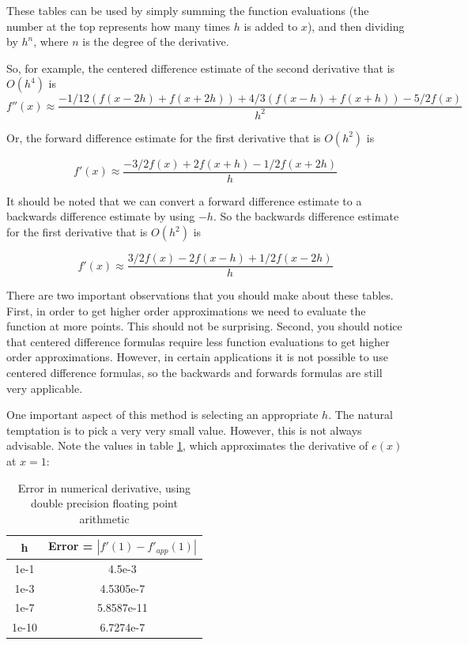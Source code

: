 These tables can be used by simply summing the function evaluations (the number at the top represents how many times $h$ is added to $x$), and then dividing by $h^n$, where $n$ is the degree of the derivative.

So, for example, the centered difference estimate of the second derivative that is $O(h^4)$ is
\begin{equation*}
f''(x) \approx \frac{-1/12(f(x-2h) + f(x+2h)) + 4/3(f(x-h) + f(x+h)) -5/2f(x)}{h^2}
\end{equation*}

Or, the forward difference estimate for the first derivative that is $O(h^2)$ is

\begin{equation*}
f'(x) \approx \frac{-3/2f(x) + 2f(x+h) - 1/2 f(x+2h)}{h}
\end{equation*}

It should be noted that we can convert a forward difference estimate to a backwards difference estimate by using $-h$. So the backwards difference estimate for the first derivative that is $O(h^2)$ is

\begin{equation*}
f'(x) \approx \frac{3/2f(x) - 2f(x-h) + 1/2 f(x-2h)}{h}
\end{equation*}

There are two important observations that you should make about these tables. First, in order to get higher order approximations we need to evaluate the function at more points. This should not be surprising. Second, you should notice that centered difference formulas require less function evaluations to get higher order approximations. However, in certain applications it is not possible to use centered difference formulas, so the backwards and forwards formulas are still very applicable.

One important aspect of this method is selecting an appropriate $h$. The natural temptation is to pick a very very small value. However, this is not always advisable. Note the values in table \ref{Table:FloatingError}, which approximates the derivative of $e(x)$ at $x = 1$:

\begin{table}[h!]
\begin{center}
\begin{tabular}{|cc|}
\hline
h & Error  = $|f'(1)-f'_{app}(1)|$ \\ \hline
1e-1 & 4.5e-3 \\
1e-3 & 4.5305e-7 \\
1e-7 & 5.8587e-11 \\
1e-10 & 6.7274e-7 \\ \hline
\end{tabular}
\caption{Error in numerical derivative, using double precision floating point arithmetic}
\label{Table:FloatingError}
\end{center}
\end{table}

